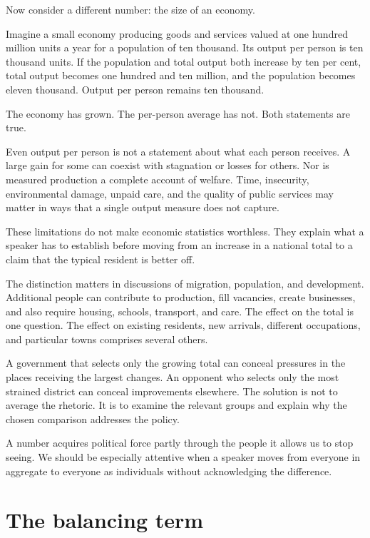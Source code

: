 \documentclass[12pt,a4paper]{book}
\begin{document}
Now consider a different number: the size of an economy.

Imagine a small economy producing goods and services valued at one hundred million units a year for a population of ten thousand. Its output per person is ten thousand units. If the population and total output both increase by ten per cent, total output becomes one hundred and ten million, and the population becomes eleven thousand. Output per person remains ten thousand.

The economy has grown. The per-person average has not. Both statements are true.

Even output per person is not a statement about what each person receives. A large gain for some can coexist with stagnation or losses for others. Nor is measured production a complete account of welfare. Time, insecurity, environmental damage, unpaid care, and the quality of public services may matter in ways that a single output measure does not capture.

These limitations do not make economic statistics worthless. They explain what a speaker has to establish before moving from an increase in a national total to a claim that the typical resident is better off.

The distinction matters in discussions of migration, population, and development. Additional people can contribute to production, fill vacancies, create businesses, and also require housing, schools, transport, and care. The effect on the total is one question. The effect on existing residents, new arrivals, different occupations, and particular towns comprises several others.

A government that selects only the growing total can conceal pressures in the places receiving the largest changes. An opponent who selects only the most strained district can conceal improvements elsewhere. The solution is not to average the rhetoric. It is to examine the relevant groups and explain why the chosen comparison addresses the policy.

A number acquires political force partly through the people it allows us to stop seeing. We should be especially attentive when a speaker moves from everyone in aggregate to everyone as individuals without acknowledging the difference.

\section*{The balancing term}
\end{document}
